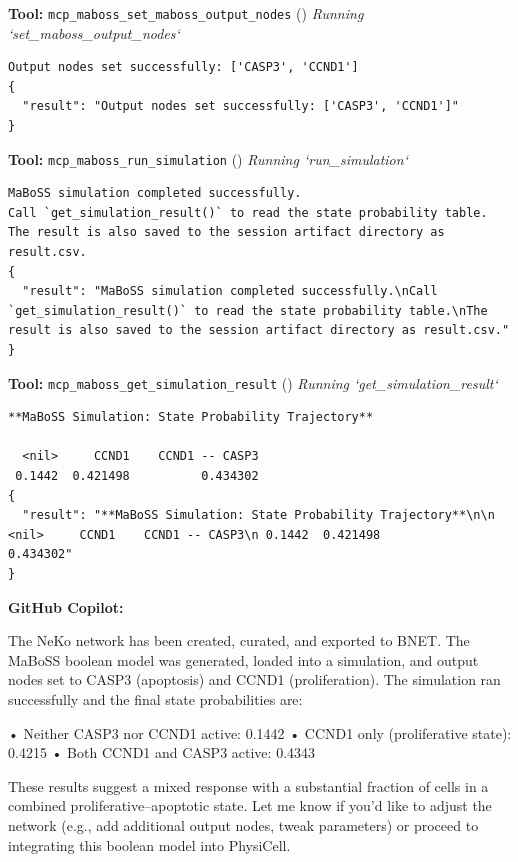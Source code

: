 \documentclass[11pt,a4paper]{article}
\begin{document}
\begin{toolokbox}
\textbf{Tool:} \texttt{mcp\_maboss\_set\_maboss\_output\_nodes} (\checkmark)
\textit{Running `set\_maboss\_output\_nodes`}
\begin{lstlisting}
Output nodes set successfully: ['CASP3', 'CCND1']
{
  "result": "Output nodes set successfully: ['CASP3', 'CCND1']"
}
\end{lstlisting}
\end{toolokbox}
\begin{toolokbox}
\textbf{Tool:} \texttt{mcp\_maboss\_run\_simulation} (\checkmark)
\textit{Running `run\_simulation`}
\begin{lstlisting}
MaBoSS simulation completed successfully.
Call `get_simulation_result()` to read the state probability table.
The result is also saved to the session artifact directory as result.csv.
{
  "result": "MaBoSS simulation completed successfully.\nCall `get_simulation_result()` to read the state probability table.\nThe result is also saved to the session artifact directory as result.csv."
}
\end{lstlisting}
\end{toolokbox}
\begin{toolokbox}
\textbf{Tool:} \texttt{mcp\_maboss\_get\_simulation\_result} (\checkmark)
\textit{Running `get\_simulation\_result`}
\begin{lstlisting}
**MaBoSS Simulation: State Probability Trajectory**

  <nil>     CCND1    CCND1 -- CASP3
 0.1442  0.421498          0.434302
{
  "result": "**MaBoSS Simulation: State Probability Trajectory**\n\n  <nil>     CCND1    CCND1 -- CASP3\n 0.1442  0.421498          0.434302"
}
\end{lstlisting}
\end{toolokbox}
\begin{copilotbox}
\textbf{GitHub Copilot:}

The NeKo network has been created, curated, and exported to BNET. The MaBoSS boolean model was generated, loaded into a simulation, and output nodes set to CASP3 (apoptosis) and CCND1 (proliferation). The simulation ran successfully and the final state probabilities are:

• Neither CASP3 nor CCND1 active: 0.1442  
• CCND1 only (proliferative state): 0.4215  
• Both CCND1 and CASP3 active: 0.4343

These results suggest a mixed response with a substantial fraction of cells in a combined proliferative–apoptotic state. Let me know if you’d like to adjust the network (e.g., add additional output nodes, tweak parameters) or proceed to integrating this boolean model into PhysiCell.

\end{copilotbox}
\end{document}

